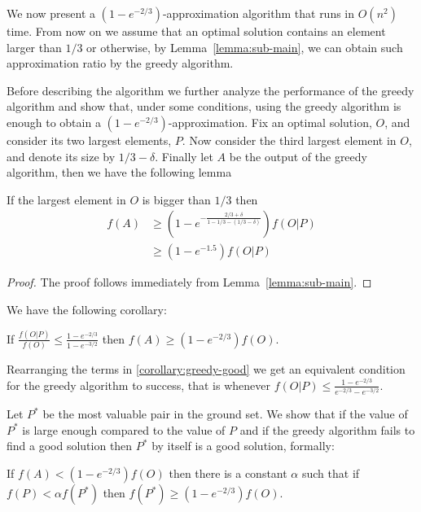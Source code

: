 We now present a $(1-e^{-2/3})$-approximation algorithm that runs in $O(n^2)$ time.
From now on we assume that an optimal solution contains an element larger than $1/3$ or otherwise, by Lemma~\ref{lemma:sub-main}, we can obtain such approximation ratio by the greedy algorithm.

Before describing the algorithm we further analyze the performance of the greedy algorithm and show that, under some conditions, using the greedy algorithm is enough to obtain a $(1-e^{-2/3})$-approximation.
Fix an optimal solution, $O$, and consider its two largest elements, $P$.
Now consider the third largest element in $O$, and denote its size by $1/3 - \delta$.
Finally let $A$ be the output of the greedy algorithm, then we have the following lemma

\begin{lemma}
	\label{eq:sub:greedy}
	If the largest element in $O$ is bigger than $1/3$ then
	\begin{align*}
		f(A) & \geq (1-e^{-\frac{2/3 + \delta}{1 - 1/3 - (1/3 - \delta)}})f(O|P)
		\\		& \geq (1 - e^{-1.5})f(O|P)
	\end{align*}
\end{lemma}

\begin{proof}
	The proof follows immediately from Lemma~\ref{lemma:sub-main}.
\end{proof}

We have the following corollary:
\begin{corollary}
	\label{corollary:greedy-good}
	If $\frac{f(O|P)}{f(O)} \leq \frac{1-e^{-2/3}}{1-e^{-3/2}}$ then $f(A) \geq (1 - e^{-2/3})f(O)$.
\end{corollary}

Rearranging the terms in \ref{corollary:greedy-good} we get an equivalent condition for the greedy algorithm to success, that is whenever $f(O|P) \leq \frac{1 - e^{-2/3}}{e^{-2/3} - e^{-3/2}}$.

Let $P^*$ be the most valuable pair in the ground set.
We show that if the value of $P^*$ is large enough compared to the value of $P$ and if the greedy algorithm fails to find a good solution then $P^*$ by itself is a good solution, formally:

\begin{lemma}
	\label{lemma:sub:alpha}
	If $f(A) < (1 - e^{-2/3})f(O)$ then there is a constant $\alpha$ such that if $f(P) < \alpha f(P^*)$ then $f(P^*) \geq (1 - e^{-2/3})f(O)$.
\end{lemma}

